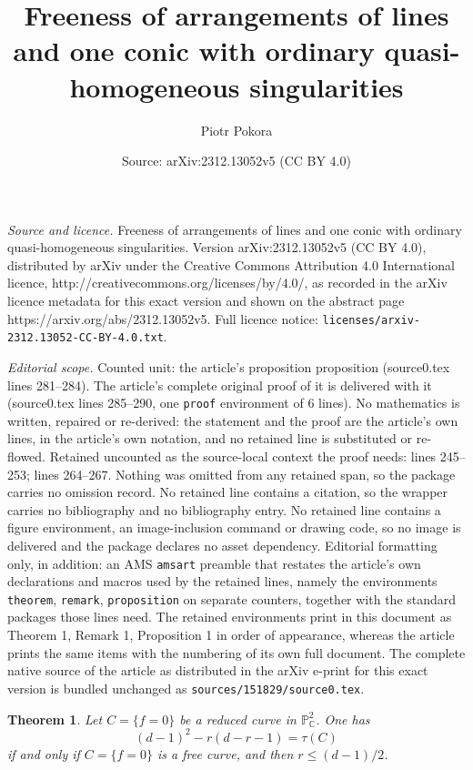 \documentclass[10pt,a4paper]{amsart}
\title{Freeness of arrangements of lines and one conic with ordinary quasi-homogeneous singularities}
\author{Piotr Pokora}
\date{Source: arXiv:2312.13052v5 (CC BY 4.0)}
\newtheorem{theorem}{Theorem}
\renewcommand\leq{\leqslant}
\begin{document}
\maketitle

\noindent\emph{Source and licence.} Freeness of arrangements of lines and one conic with ordinary quasi-homogeneous singularities. Version arXiv:2312.13052v5 (CC BY 4.0), distributed by arXiv under the Creative Commons Attribution 4.0 International licence, http://creativecommons.org/licenses/by/4.0/, as recorded in the arXiv licence metadata for this exact version and shown on the abstract page https://arxiv.org/abs/2312.13052v5. Full licence notice: \texttt{licenses/arxiv-2312.13052-CC-BY-4.0.txt}.\par\smallskip

\noindent\textit{Editorial scope.} Counted unit: the article's proposition proposition (source0.tex lines 281--284). The article's complete original proof of it is delivered with it (source0.tex lines 285--290, one \texttt{proof} environment of 6 lines). No mathematics is written, repaired or re-derived: the statement and the proof are the article's own lines, in the article's own notation, and no retained line is substituted or re-flowed.  Retained uncounted as the source-local context the proof needs: lines 245--253; lines 264--267.  Nothing was omitted from any retained span, so the package carries no omission record.  No retained line contains a citation, so the wrapper carries no bibliography and no bibliography entry.  No retained line contains a figure environment, an image-inclusion command or drawing code, so no image is delivered and the package declares no asset dependency.  Editorial formatting only, in addition: an AMS \texttt{amsart} preamble that restates the article's own declarations and macros used by the retained lines, namely the environments \texttt{theorem}, \texttt{remark}, \texttt{proposition} on separate counters, together with the standard packages those lines need.  The retained environments print in this document as Theorem 1, Remark 1, Proposition 1 in order of appearance, whereas the article prints the same items with the numbering of its own full document.  The complete native source of the article as distributed in the arXiv e-print for this exact version is bundled unchanged as \texttt{sources/151829/source0.tex}.
\begin{theorem}
\label{dddp}
Let $C = \{f=0\}$ be a reduced curve in $\mathbb{P}^{2}_{\mathbb{C}}$. One has
\begin{equation}
\label{duPles}
(d-1)^{2} - r(d-r-1) = \tau(C)
\end{equation}
if and only if $C = \{f=0\}$ is a free curve, and then $r \leq (d-1)/2$.
\end{theorem}
\end{document}
